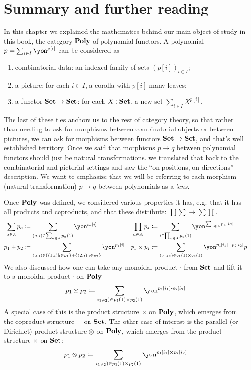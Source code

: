 \documentclass[Book-Poly]{subfiles}
\begin{document}
\section{Summary and further reading}

In this chapter we explained the mathematics behind our main object of study in this book, the category $\mathbf{Poly}$ of polynomial functors. A polynomial $p=\sum_{i\in I}\yon^{p[i]}$ can be considered as
\begin{enumerate}
	\item combinatorial data: an indexed family of sets $(p[i])_{i\in I}$;
	\item a picture: for each $i\in I$, a corolla with $p[i]$-many leaves;
	\item a functor $\mathbf{Set}\to\mathbf{Set}$: for each $X:\mathbf{Set}$, a new set $\sum_{i\in I}X^{p[i]}$.
\end{enumerate}
The last of these ties anchors us to the rest of category theory, so that rather than needing to ask for morphisms between combinatorial objects or between pictures, we can ask for morphisms between functors $\mathbf{Set}\to\mathbf{Set}$, and that's well established territory. Once we said that morphisms $p\to q$ between polynomial functors should just be natural transformations, we translated that back to the combinatorial and pictorial settings and saw the ``on-positions, on-directions'' description. We want to emphasize that we will be referring to each morphism (natural transformation) $p\to q$ between polynomials as a \emph{lens}.

Once $\mathbf{Poly}$ was defined, we considered various properties it has, e.g.\ that it has all products and coproducts, and that these distribute: $\prod\sum\to\sum\prod$.
\begin{align*}
	\sum_{a\in A}p_a&\coloneqq\sum_{(a,i)\in\sum_{a\in A}p_a(1)}\yon^{p_a[i]}&
	\prod_{a\in A}p_a&\coloneqq\sum_{i\in\prod_{a\in A}p_a(1)}\yon^{\sum_{a\in A}p_a[i a]}
\\
	p_1+p_2&\coloneqq\sum_{(a,i)\in\{(1,i)\mid i\in p_1\}+\{(2,i)\mid i\in p_2\}}\yon^{p_a[i]}&
	p_1\times p_2&\coloneqq\sum_{(i_1,i_2)\in p_1(1)\times p_2(1)}\yon^{p_1[i_1]+p_2[i_2]}
	p
\end{align*}
We also discussed how one can take any monoidal product $\cdot$ from $\mathbf{Set}$ and lift it to a monoidal product $\cdot$ on $\mathbf{Poly}$:
\[
	p_1\odot p_2\coloneqq\sum_{i_1,i_2)\in p_1(1)\times p_2(1)}\yon^{p_1[i_1]\cdot p_2[i_2]}
\]
A special case of this is the product structure $\times$ on $\mathbf{Poly}$, which emerges from the coproduct structure $+$ on $\mathbf{Set}$. The other case of interest is the parallel (or Dirichlet) product structure $\otimes$ on $\mathbf{Poly}$, which emerges from the product structure $\times$ on $\mathbf{Set}$:
\[
	p_1\otimes p_2\coloneqq\sum_{i_1,i_2)\in p_1(1)\times p_2(1)}\yon^{p_1[i_1]\times p_2[i_2]}
\]
\end{document}

